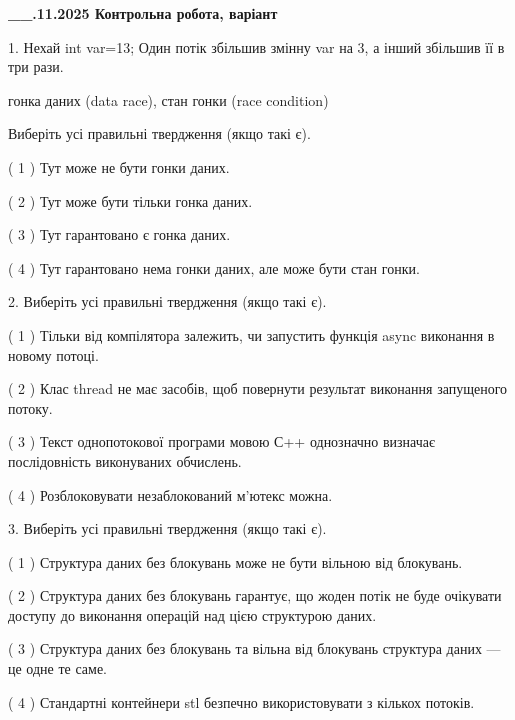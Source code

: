 \documentclass[12pt, ukrainian]{article}
\begin{document}
\newpage
\begin {large}

\textbf{\_\_.11.2025 Контрольна робота, варіант  }\par


{
1. Нехай int var=13; Один потік збільшив змінну var на 3, а інший збільшив її в три рази.

гонка даних (data race), стан гонки (race condition)

Виберіть усі правильні твердження (якщо такі є).\par
\vspace{2mm}
( 1 ) Тут може не бути гонки даних.%

( 2 ) Тут може бути тільки гонка даних.%

( 3 ) Тут гарантовано є гонка даних.%

( 4 ) Тут гарантовано нема гонки даних, але може бути стан гонки.%


2. Виберіть усі правильні твердження (якщо такі є).\par
\vspace{2mm}

( 1 ) Тільки від компілятора залежить, чи запустить функція async виконання в новому потоці.%

( 2 ) Клас thread не має засобів, щоб повернути результат виконання запущеного потоку.%

( 3 ) Текст однопотокової програми мовою С++ однозначно визначає послідовність виконуваних обчислень.%

( 4 ) Розблоковувати незаблокований м’ютекс можна.%


3. Виберіть усі правильні твердження (якщо такі є).\par
\vspace{2mm}

( 1 ) Структура даних без блокувань може не бути вільною від блокувань.%

( 2 ) Структура даних без блокувань гарантує, що жоден потік не буде очікувати доступу до виконання операцій над цією структурою даних.%

( 3 ) Структура даних без блокувань та вільна від блокувань структура даних --- це одне те саме.%

( 4 ) Стандартні контейнери stl безпечно використовувати з кількох потоків.%


}
\end{large}
\end{document}
